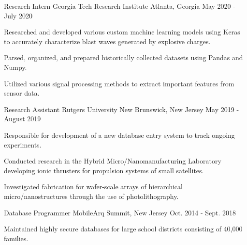 \begin{cventries}
\vspace{-1mm}
    \cventry
    {Research Intern}
    {Georgia Tech Research Institute}
    {Atlanta, Georgia}
    {May 2020 - July 2020}
    {
      \begin{cvitems}
        \item {Researched and developed various custom machine learning models using Keras to accurately characterize blast waves generated by explosive charges.}
             \vspace{1mm}
        \item {Parsed, organized, and prepared historically collected datasets using Pandas and Numpy.}
             \vspace{1mm}
        \item {Utilized various signal processing methods to extract important features from sensor data.}
      \end{cvitems}
    }
    \vspace{-0.5mm}
    \cventry
    {Research Assistant}
    {Rutgers University}
    {New Brunswick, New Jersey}
    {May 2019 - August 2019}
    {
      \begin{cvitems}
        \item {Responsible for development of a new database entry system to track ongoing experiments.}
             \vspace{1mm}
        \item {Conducted research in the Hybrid Micro/Nanomanufacturing Laboratory developing ionic thrusters for propulsion systems of small satellites.}
             \vspace{1mm}
        \item {Investigated fabrication for wafer-scale arrays of hierarchical micro/nanostructures through the use of photolithography.}
      \end{cvitems}
    }
        \vspace{-0.5mm}
  \cventry
    {Database Programmer}
    {MobileArq}
    {Summit, New Jersey}
    {Oct. 2014 - Sept. 2018}
    {
      \begin{cvitems}
        \item {Maintained highly secure databases for large school districts consisting of 40,000 families.}

\end{cvitems}}
\end{cventries}
